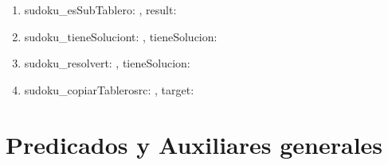\documentclass[a4paper]{article}
\begin{document}
\begin{enumerate}
\item

\begin{especificacion}{sudoku\_esSubTablero}{\In {}: \matriz{\ent}, \Out result: \bool}{}{}
\end{especificacion} 

\item

\begin{especificacion}{sudoku\_tieneSolucion}{\In t: \matriz{\ent}, \Out tieneSolucion: \bool}{}{}
\end{especificacion} 
            
\item

\begin{especificacion}{sudoku\_resolver}{\Inout t: \matriz{\ent}, \Out tieneSolucion: \bool}
\end{especificacion} 
            
\item

\begin{especificacion}{sudoku\_copiarTablero}{\In src: \matriz{\ent}, \Out  target: \matriz{\ent}}{}{}
\end{especificacion} 

\end{enumerate}

\section{Predicados y Auxiliares generales}
\end{document}
